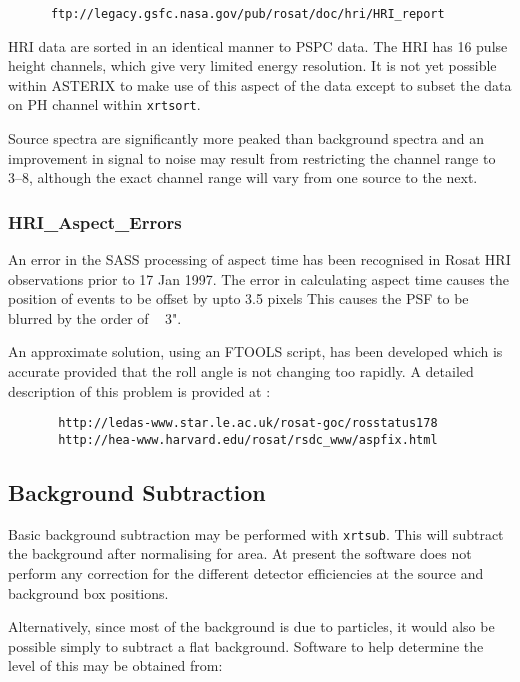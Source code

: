 \documentclass[11pt,fleqn]{article}    %
\begin{document}
\begin{verbatim}
      ftp://legacy.gsfc.nasa.gov/pub/rosat/doc/hri/HRI_report
\end{verbatim}

HRI data are sorted in an identical manner to PSPC data. The HRI has 
16 pulse height channels, which give very limited energy resolution. It is not
yet possible within ASTERIX to make use of this aspect of the data
except to subset the data on PH channel within {\tt xrtsort}.

Source spectra are significantly more peaked than background spectra
and an improvement in signal to noise may result from restricting the
channel range to 3--8, although the exact channel range will vary
from one source to the next.

\subsubsection {HRI\_Aspect\_Errors}

An error in the SASS processing of aspect time has been recognised in Rosat
HRI observations prior to 17 Jan 1997. The error in calculating aspect time
causes the position of  events to be offset  by upto 3.5 pixels This causes
the PSF to be blurred by the order of ~ 3".

An approximate solution,  using an FTOOLS script, has  been developed 
which is accurate provided that the  roll  angle is not changing too rapidly. A  
detailed description of this problem is provided at :

\begin{verbatim}
       http://ledas-www.star.le.ac.uk/rosat-goc/rosstatus178
       http://hea-www.harvard.edu/rosat/rsdc_www/aspfix.html   
\end{verbatim}

\subsection{Background Subtraction}
Basic background subtraction may be performed with {\tt xrtsub}. This will
subtract the background after normalising for area. At present
the software does not perform any correction for the different detector
efficiencies at the source and background box positions.

Alternatively, since most of the background is due to particles, it would
also be possible simply to subtract a flat background. Software to help
determine the level of this may be obtained from:
\end{document}
